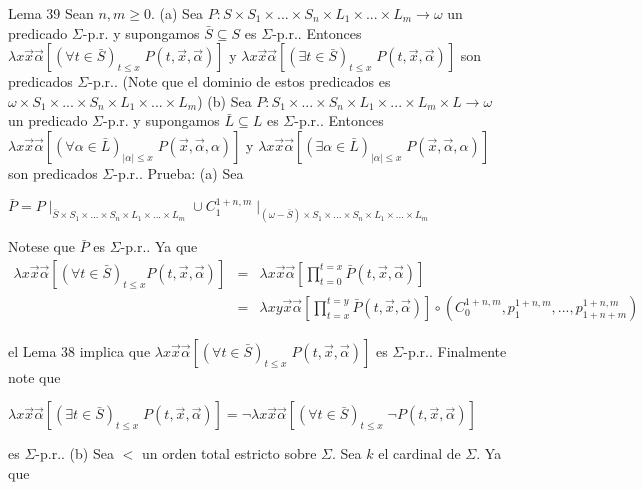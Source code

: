 Lema 39 Sean \(n,m\geq 0\).
(a) Sea \(P:S\times S_{1}\times ...\times S_{n}\times L_{1}\times ...\times L_{m}\rightarrow \omega \) un predicado \(\Sigma \)-p.r. y supongamos \(\bar{S}\subseteq S\) es \(\Sigma \)-p.r.. Entonces \(\lambda x\vec{x}\vec{\alpha }\left[ (\forall t\in \bar{S})_{t\leq x}\;P(t,\vec{x},\vec{\alpha})\right] \) y \(\lambda x\vec{x}\vec{\alpha}\left[ (\exists t\in \bar{S})_{t\leq x}\;P(t, \vec{x},\vec{\alpha})\right] \) son predicados \(\Sigma \)-p.r.. (Note que el dominio de estos predicados es \(\omega \times S_{1}\times ...\times S_{n}\times L_{1}\times ...\times L_{m}\))
(b) Sea \(P:S_{1}\times ...\times S_{n}\times L_{1}\times ...\times L_{m}\times L\rightarrow \omega \) un predicado \(\Sigma \)-p.r. y supongamos \( \bar{L}\subseteq L\) es \(\Sigma \)-p.r.. Entonces \(\lambda x\vec{x}\vec{\alpha} \left[ (\forall \alpha \in \bar{L})_{\left\vert \alpha \right\vert \leq x}\;P(\vec{x},\vec{\alpha},\alpha )\right] \) y \(\lambda x\vec{x}\vec{\alpha} \left[ (\exists \alpha \in \bar{L})_{\left\vert \alpha \right\vert \leq x}\;P(\vec{x},\vec{\alpha},\alpha )\right] \) son predicados \(\Sigma \)-p.r..
Prueba: (a) Sea

\(\displaystyle \bar{P}=P\mid _{\bar{S}\times S_{1}\times ...\times S_{n}\times L_{1}\times ...\times L_{m}}\cup C_{1}^{1+n,m}\mid _{(\omega -\bar{S})\times S_{1}\times ...\times S_{n}\times L_{1}\times ...\times L_{m}} \)

Notese que \(\bar{P}\) es \(\Sigma \)-p.r.. Ya que
\(\displaystyle \begin{array}{rcl} \lambda x\vec{x}\vec{\alpha}\left[ (\forall t\in \bar{S})_{t\leq x}P(t,\vec{x },\vec{\alpha})\right] & =& \lambda x\vec{x}\vec{\alpha}\left[ \prod\limits_{t=0}^{t=x}\bar{P}(t,\vec{x},\vec{\alpha})\right] \\ & =& \lambda xy\vec{x}\vec{\alpha}\left[ \prod\limits_{t=x}^{t=y}\bar{P}(t, \vec{x},\vec{\alpha})\right] \circ \left( C_{0}^{1+n,m},p_{1}^{1+n,m},...,p_{1+n+m}^{1+n,m}\right) \end{array} \)

el Lema 38 implica que \(\lambda x\vec{x}\vec{\alpha}\left[ (\forall t\in \bar{S})_{t\leq x}\;P(t,\vec{x},\vec{\alpha})\right] \) es \( \Sigma \)-p.r..
Finalmente note que

\(\displaystyle \lambda x\vec{x}\vec{\alpha}\left[ (\exists t\in \bar{S})_{t\leq x}\;P(t, \vec{x},\vec{\alpha})\right] =\lnot \lambda x\vec{x}\vec{\alpha}\left[ (\forall t\in \bar{S})_{t\leq x}\;\lnot P(t,\vec{x},\vec{\alpha})\right] \)

es \(\Sigma \)-p.r..
(b) Sea \(< \) un orden total estricto sobre \(\Sigma .\) Sea \(k\) el cardinal de \( \Sigma \). Ya que

